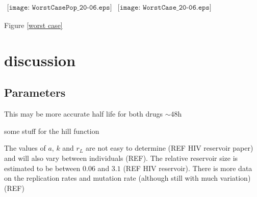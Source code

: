 \documentclass[DIV=15]{scrartcl}
\begin{document}
  
  
   


  
  \begin{figure*}[h]
 \begin{center}$
 \begin{array}{cc}
 \texttt{[image: WorstCasePop\_20-06.eps]} &
 \texttt{[image: WorstCase\_20-06.eps]}
 \end{array}$
 \end{center}
	\caption{Solution to equations(\ref{between host eqns1}-\ref{between host eqns4}). PrEP is introduced at $t=0$, there is a decrease in the number  of infections (COMPARE TO REAL).  But  the relative incidence of resistant virus increases massively during the $20$ years following introduction of PrEP }
\label{worst case} 
\end{figure*}

Figure  \ref{worst case}
  
  
  
  
\section{discussion}  
  
  
  \iffalse
  
  
  
\subsection{Parameters}
\label{Parameters}


 This may be more accurate half life for both drugs $\sim 48$h~\cite{patterson2011}
 
 

some stuff for the hill function~\cite{shirreff2011}
~\cite{hollingsworth2008}



The values of $a$, $k$ and $r_L$ are not easy to determine (REF HIV reservoir paper)
and will also vary between individuals (REF). The relative reservoir size is estimated to be between $0.06$ and $3.1$ (REF HIV reservoir). There is more data on the replication rates and mutation rate (although still with much variation) (REF)
\end{document}
